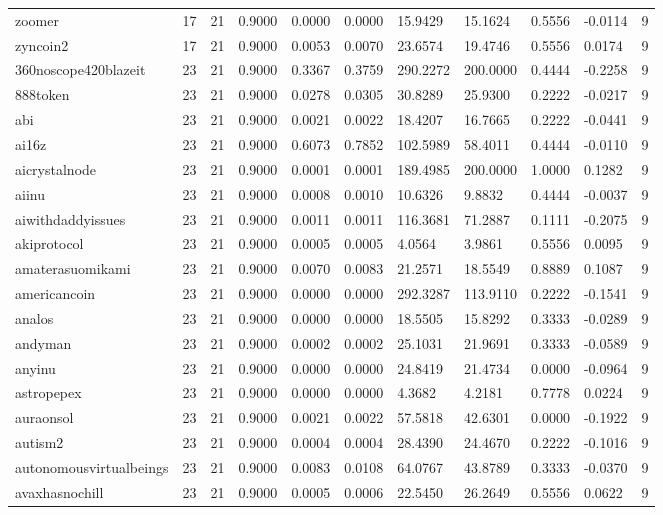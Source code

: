 \begin{table}[htbp]
\begin{tabular}{lllllllllll}
zoomer & 17 & 21 & 0.9000 & 0.0000 & 0.0000 & 15.9429 & 15.1624 & 0.5556 & -0.0114 & 9 \\
zyncoin2 & 17 & 21 & 0.9000 & 0.0053 & 0.0070 & 23.6574 & 19.4746 & 0.5556 & 0.0174 & 9 \\
360noscope420blazeit & 23 & 21 & 0.9000 & 0.3367 & 0.3759 & 290.2272 & 200.0000 & 0.4444 & -0.2258 & 9 \\
888token & 23 & 21 & 0.9000 & 0.0278 & 0.0305 & 30.8289 & 25.9300 & 0.2222 & -0.0217 & 9 \\
abi & 23 & 21 & 0.9000 & 0.0021 & 0.0022 & 18.4207 & 16.7665 & 0.2222 & -0.0441 & 9 \\
ai16z & 23 & 21 & 0.9000 & 0.6073 & 0.7852 & 102.5989 & 58.4011 & 0.4444 & -0.0110 & 9 \\
aicrystalnode & 23 & 21 & 0.9000 & 0.0001 & 0.0001 & 189.4985 & 200.0000 & 1.0000 & 0.1282 & 9 \\
aiinu & 23 & 21 & 0.9000 & 0.0008 & 0.0010 & 10.6326 & 9.8832 & 0.4444 & -0.0037 & 9 \\
aiwithdaddyissues & 23 & 21 & 0.9000 & 0.0011 & 0.0011 & 116.3681 & 71.2887 & 0.1111 & -0.2075 & 9 \\
akiprotocol & 23 & 21 & 0.9000 & 0.0005 & 0.0005 & 4.0564 & 3.9861 & 0.5556 & 0.0095 & 9 \\
amaterasuomikami & 23 & 21 & 0.9000 & 0.0070 & 0.0083 & 21.2571 & 18.5549 & 0.8889 & 0.1087 & 9 \\
americancoin & 23 & 21 & 0.9000 & 0.0000 & 0.0000 & 292.3287 & 113.9110 & 0.2222 & -0.1541 & 9 \\
analos & 23 & 21 & 0.9000 & 0.0000 & 0.0000 & 18.5505 & 15.8292 & 0.3333 & -0.0289 & 9 \\
andyman & 23 & 21 & 0.9000 & 0.0002 & 0.0002 & 25.1031 & 21.9691 & 0.3333 & -0.0589 & 9 \\
anyinu & 23 & 21 & 0.9000 & 0.0000 & 0.0000 & 24.8419 & 21.4734 & 0.0000 & -0.0964 & 9 \\
astropepex & 23 & 21 & 0.9000 & 0.0000 & 0.0000 & 4.3682 & 4.2181 & 0.7778 & 0.0224 & 9 \\
auraonsol & 23 & 21 & 0.9000 & 0.0021 & 0.0022 & 57.5818 & 42.6301 & 0.0000 & -0.1922 & 9 \\
autism2 & 23 & 21 & 0.9000 & 0.0004 & 0.0004 & 28.4390 & 24.4670 & 0.2222 & -0.1016 & 9 \\
autonomousvirtualbeings & 23 & 21 & 0.9000 & 0.0083 & 0.0108 & 64.0767 & 43.8789 & 0.3333 & -0.0370 & 9 \\
avaxhasnochill & 23 & 21 & 0.9000 & 0.0005 & 0.0006 & 22.5450 & 26.2649 & 0.5556 & 0.0622 & 9 \\

\end{tabular}
\end{table}
